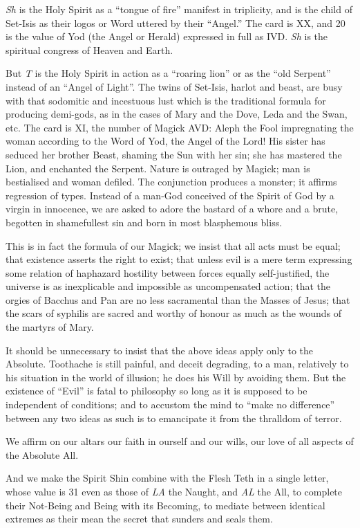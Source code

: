 \textit{Sh} is the Holy Spirit as a \enquote{tongue of fire} manifest in triplicity, and is the child of Set-Isis as their logos or Word uttered by their \enquote{Angel.} The card is XX, and 20 is the value of Yod (the Angel or Herald) expressed in full as IVD. \textit{Sh} is the spiritual congress of Heaven and Earth.

But \textit{T} is the Holy Spirit in action as a \enquote{roaring lion} or as the \enquote{old Serpent} instead of an \enquote{Angel of Light}. The twins of Set-Isis, harlot and beast, are busy with that sodomitic and incestuous lust which is the traditional formula for producing demi-gods, as in the cases of Mary and the Dove, Leda and the Swan, etc. The card is XI, the number of Magick AVD: Aleph the Fool impregnating the woman according to the Word of Yod, the Angel of the Lord! His sister has seduced her brother Beast, shaming the Sun with her sin; she has mastered the Lion, and enchanted the Serpent. Nature is outraged by Magick; man is bestialised and woman defiled. The conjunction produces a monster; it affirms regression of types. Instead of a man-God conceived of the Spirit of God by a virgin in innocence, we are asked to adore the bastard of a whore and a brute, begotten in shamefullest sin and born in most blasphemous bliss.

This is in fact the formula of our Magick; we insist that all acts must be equal; that existence asserts the right to exist; that unless evil is a mere term expressing some relation of haphazard hostility between forces equally self-justified, the universe is as inexplicable and impossible as uncompensated action; that the orgies of Bacchus and Pan are no less sacramental than the Masses of Jesus; that the scars of syphilis are sacred and worthy of honour as much as the wounds of the martyrs of Mary.

It should be unnecessary to insist that the above ideas apply only to the Absolute. Toothache is still painful, and deceit degrading, to a man, relatively to his situation in the world of illusion; he does his Will by avoiding them. But the existence of \enquote{Evil} is fatal to philosophy so long as it is supposed to be independent of conditions; and to accustom the mind to \enquote{make no difference} between any two ideas as such is to emancipate it from the thralldom of terror.

We affirm on our altars our faith in ourself and our wills, our love of all aspects of the Absolute All.

And we make the Spirit Shin combine with the Flesh Teth in a single letter, whose value is 31 even as those of \textit{LA} the Naught, and \textit{AL} the All, to complete their Not-Being and Being with its Becoming, to mediate between identical extremes as their mean \textemdash{} the secret that sunders and seals them.

